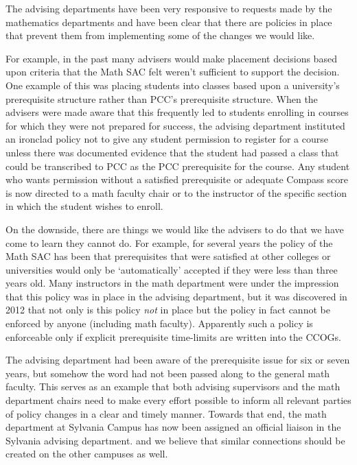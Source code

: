The advising departments have been very responsive to requests made by the
mathematics departments and have been clear that there are
policies in place that prevent them from implementing some of the changes we
would like.  

For example, in the past many advisers would make placement decisions based
upon criteria that the Math SAC felt weren't sufficient to support the
decision.   One example of this was placing students into classes based upon a
university's prerequisite structure rather than PCC's prerequisite structure.
When the advisers were made aware that this frequently led to students
enrolling in courses for which they were not prepared for success, the advising
department instituted an ironclad policy not to give any student permission to
register for a course unless there was documented evidence that the student had
passed a class that could be transcribed to PCC as the PCC prerequisite for
the course.  Any student who wants permission without a satisfied prerequisite
or adequate Compass score is now directed to a math faculty chair or to the
instructor of the specific section in which the student wishes to enroll.

On the downside, there are things we would like the advisers to do that we
have come to learn they cannot do.  For example, for several years the policy
of the Math SAC has been that prerequisites that were satisfied at other
colleges or universities would only be `automatically' accepted if they were
less than three years old.  Many instructors in the math department were under
the impression that this policy was in place in the advising department, but it
was discovered in 2012 that not only is this policy \emph{not} in place but the policy in fact cannot be enforced by anyone
(including math faculty).   Apparently such a policy is enforceable only if
explicit prerequisite time-limits are written into the CCOGs.  

The advising department had been aware of the prerequisite issue for six or
seven years, but somehow the word had not been passed along to the general math
faculty.  This serves as an example that both advising supervisors and the math
department chairs need to make every effort possible to inform all relevant
parties of policy changes in a clear and timely manner.  Towards that end, the
math department at Sylvania Campus has now been assigned an official liaison in
the Sylvania advising department. and we believe that similar connections
should be created on the other campuses as well.


